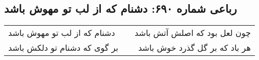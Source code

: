 \begin{center}
\section*{رباعی شماره ۶۹۰: دشنام که از لب تو مهوش باشد}
\label{sec:0690}
\begin{longtable}{l p{0.5cm} r}
دشنام که از لب تو مهوش باشد
&&
چون لعل بود که اصلش آتش باشد
\\
بر گوی که دشنام تو دلکش باشد
&&
هر باد که بر گل گذرد خوش باشد
\\
\end{longtable}
\end{center}
